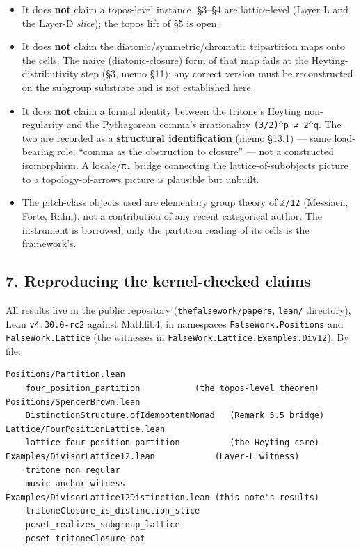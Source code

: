 \documentclass[
  11pt,
]{article}
\providecommand{\tightlist}{%
  \setlength{\itemsep}{0pt}\setlength{\parskip}{0pt}}
\begin{document}
\begin{itemize}
\tightlist
\item
  It does \textbf{not} claim a topos-level instance. §3--§4 are
  lattice-level (Layer L and the Layer-D \emph{slice}); the topos lift
  of §5 is open.
\item
  It does \textbf{not} claim the diatonic/symmetric/chromatic
  tripartition maps onto the cells. The naive (diatonic-closure) form of
  that map fails at the Heyting-distributivity step (§3, memo §11); any
  correct version must be reconstructed on the subgroup substrate and is
  not established here.
\item
  It does \textbf{not} claim a formal identity between the tritone's
  Heyting non-regularity and the Pythagorean comma's irrationality
  \texttt{(3/2)\^{}p\ ≠\ 2\^{}q}. The two are recorded as a
  \textbf{structural identification} (memo §13.1) --- same load-bearing
  role, ``comma as the obstruction to closure'' --- not a constructed
  isomorphism. A locale/\texttt{π₁} bridge connecting the
  lattice-of-subobjects picture to a topology-of-arrows picture is
  plausible but unbuilt.
\item
  The pitch-class objects used are elementary group theory of
  \texttt{ℤ/12} (Messiaen, Forte, Rahn), not a contribution of any
  recent categorical author. The instrument is borrowed; only the
  partition reading of its cells is the framework's.
\end{itemize}

\subsection{7. Reproducing the kernel-checked
claims}\label{reproducing-the-kernel-checked-claims}

All results live in the public repository (\texttt{thefalsework/papers},
\texttt{lean/} directory), Lean \texttt{v4.30.0-rc2} against Mathlib4,
in namespaces \texttt{FalseWork.Positions} and
\texttt{FalseWork.Lattice} (the witnesses in
\texttt{FalseWork.Lattice.Examples.Div12}). By file:

\begin{verbatim}
Positions/Partition.lean
    four_position_partition           (the topos-level theorem)
Positions/SpencerBrown.lean
    DistinctionStructure.ofIdempotentMonad   (Remark 5.5 bridge)
Lattice/FourPositionLattice.lean
    lattice_four_position_partition          (the Heyting core)
Examples/DivisorLattice12.lean            (Layer-L witness)
    tritone_non_regular
    music_anchor_witness
Examples/DivisorLattice12Distinction.lean (this note's results)
    tritoneClosure_is_distinction_slice
    pcset_realizes_subgroup_lattice
    pcset_tritoneClosure_bot
\end{verbatim}
\end{document}
